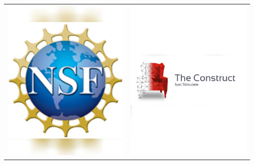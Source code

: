 \documentclass[landscape,a0paper,fontscale=0.292]{baposter}
\begin{document}
\begin{poster}
{\begin{center}
\begin{tabularx}{\linewidth}{X X}
{\centering \includegraphics[width=0.8\linewidth]{nsf.jpg}}&
{\centering \includegraphics[width=0.8\linewidth]{theconstruct.jpg}}\\ 


\end{tabularx}
\end{center}}
\end{poster}
\end{document}
